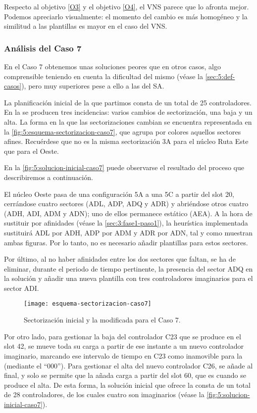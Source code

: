 Respecto al objetivo \ref{O3} y el objetivo \ref{O4}, el VNS parece que lo afronta mejor. Podemos apreciarlo visualmente: el momento del cambio es más homogéneo y la similitud a las plantillas es mayor en el caso del VNS.

\subsubsection{Análisis del Caso 7}

En el Caso 7 obtenemos unas soluciones peores que en otros casos, algo comprensible teniendo en cuenta la dificultad del mismo (véase la \autoref{sec:5:def-casos}), pero muy superiores pese a ello a las del SA. 

La planificación inicial de la que partimos consta de un total de 25 controladores. 
En la \faseuno{} se producen tres incidencias: varios cambios de sectorización, una baja y un alta.
La forma en la que las sectorizaciones cambian se encuentra representada en la \autoref{fig:5:esquema-sectorizacion-caso7}, que agrupa por colores aquellos sectores afines. 
Recuérdese que no es la misma sectorización 3A para el núcleo Ruta Este que para el Oeste. 

En la \autoref{fig:5:solucion-inicial-caso7} puede observarse el resultado del proceso que describiremos a continuación.

El núcleo Oeste pasa de una configuración 5A a una 5C a partir del slot 20, cerrándose cuatro sectores (ADL, ADP, ADQ y ADR) y abriéndose otros cuatro (ADH, ADI, ADM y ADN); uno de ellos permanece estático (AEA). 
A la hora de sustituir por afinidades (véase la \autoref{sec:3:fase1-paso1}), la heurística implementada sustituirá ADL por ADH, ADP por ADM y ADR por ADN, tal y como muestran ambas figuras. Por lo tanto, no es necesario añadir plantillas para estos sectores. 

Por último, al no haber afinidades entre los dos sectores que faltan, se ha de eliminar, durante el periodo de tiempo pertinente, la presencia del sector ADQ en la solución y añadir una nueva plantilla con tres controladores imaginarios para el sector ADI.

\begin{figure}
	\centering
	\texttt{[image: esquema-sectorizacion-caso7]}
	\caption{Sectorización inicial y la modificada para el Caso 7.}
	\label{fig:5:esquema-sectorizacion-caso7}
\end{figure}

Por otro lado, para gestionar la baja del controlador C23 que se produce en el slot 42, se mueve toda su carga a partir de ese instante a un nuevo controlador imaginario, marcando ese intervalo de tiempo en C23 como inamovible para la \fasedos{} (mediante el ``000'').
Para gestionar el alta del nuevo controlador C26, se añade al final, y solo se permite que la \fasedos{} añada carga a partir del slot 60, que es cuando se produce el alta. De esta forma, la solución inicial que ofrece la \faseuno{} consta de un total de 28 controladores, de los cuales cuatro son imaginarios (véase la \autoref{fig:5:solucion-inicial-caso7}).

